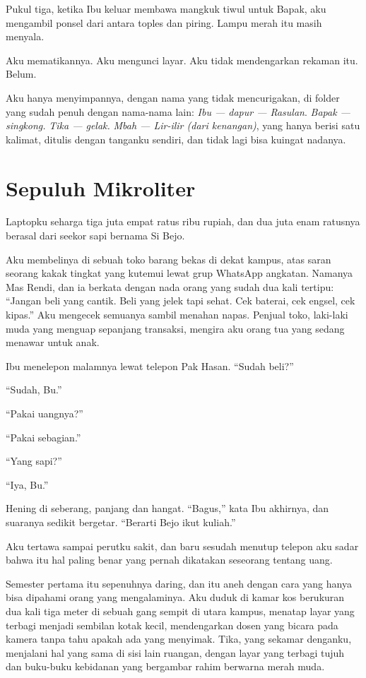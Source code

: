 \documentclass[11pt,twoside,openany]{book}
\makeatletter
\newcommand{\scenebreak}{\par\vspace{0.9em}{\centering\textsc{*\hspace{0.7em}*\hspace{0.7em}*}\par}\vspace{0.9em}\@afterindentfalse\@afterheading}
\makeatother
\begin{document}
Pukul tiga, ketika Ibu keluar membawa mangkuk tiwul untuk Bapak, aku mengambil ponsel dari antara toples dan piring. Lampu merah itu masih menyala.

Aku mematikannya. Aku mengunci layar. Aku tidak mendengarkan rekaman itu. Belum.

Aku hanya menyimpannya, dengan nama yang tidak mencurigakan, di folder yang sudah penuh dengan nama-nama lain: \emph{Ibu --- dapur --- Rasulan}. \emph{Bapak --- singkong.} \emph{Tika --- gelak.} \emph{Mbah --- Lir-ilir (dari kenangan)}, yang hanya berisi satu kalimat, ditulis dengan tanganku sendiri, dan tidak lagi bisa kuingat nadanya.

\chapter{Sepuluh Mikroliter}
Laptopku seharga tiga juta empat ratus ribu rupiah, dan dua juta enam ratusnya berasal dari seekor sapi bernama Si Bejo.

Aku membelinya di sebuah toko barang bekas di dekat kampus, atas saran seorang kakak tingkat yang kutemui lewat grup WhatsApp angkatan. Namanya Mas Rendi, dan ia berkata dengan nada orang yang sudah dua kali tertipu: ``Jangan beli yang cantik. Beli yang jelek tapi sehat. Cek baterai, cek engsel, cek kipas.'' Aku mengecek semuanya sambil menahan napas. Penjual toko, laki-laki muda yang menguap sepanjang transaksi, mengira aku orang tua yang sedang menawar untuk anak.

Ibu menelepon malamnya lewat telepon Pak Hasan. ``Sudah beli?''

``Sudah, Bu.''

``Pakai uangnya?''

``Pakai sebagian.''

``Yang sapi?''

``Iya, Bu.''

Hening di seberang, panjang dan hangat. ``Bagus,'' kata Ibu akhirnya, dan suaranya sedikit bergetar. ``Berarti Bejo ikut kuliah.''

Aku tertawa sampai perutku sakit, dan baru sesudah menutup telepon aku sadar bahwa itu hal paling benar yang pernah dikatakan seseorang tentang uang.

\scenebreak
Semester pertama itu sepenuhnya daring, dan itu aneh dengan cara yang hanya bisa dipahami orang yang mengalaminya. Aku duduk di kamar kos berukuran dua kali tiga meter di sebuah gang sempit di utara kampus, menatap layar yang terbagi menjadi sembilan kotak kecil, mendengarkan dosen yang bicara pada kamera tanpa tahu apakah ada yang menyimak. Tika, yang sekamar denganku, menjalani hal yang sama di sisi lain ruangan, dengan layar yang terbagi tujuh dan buku-buku kebidanan yang bergambar rahim berwarna merah muda.
\end{document}
